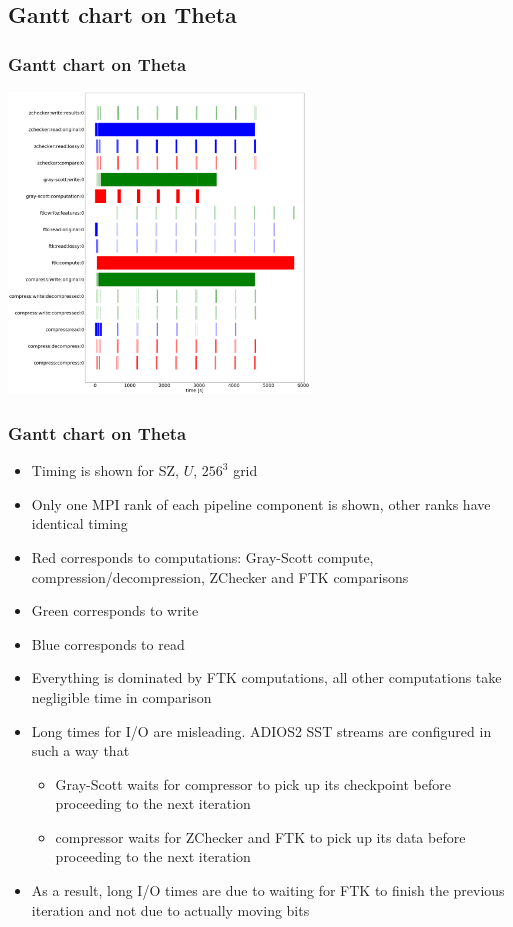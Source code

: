 \subsection{Gantt chart on Theta}

\begin{frame}[fragile]
  \frametitle{Gantt chart on Theta}

  \begin{center}
    \includegraphics[width=8cm]{graphs/gantt_theta.png}
  \end{center}
\end{frame}


\begin{frame}[fragile]
  \frametitle{Gantt chart on Theta}
  \begin{itemize}
  \item Timing is shown for SZ, $U$, $256^3$ grid
  \item Only one MPI rank of each pipeline component is shown, other ranks have identical timing
  \item Red corresponds to computations: Gray-Scott compute, compression/decompression, ZChecker and FTK comparisons
  \item Green corresponds to write
  \item Blue corresponds to read
  \item Everything is dominated by FTK computations, all other computations take negligible time in comparison
  \item Long times for I/O are misleading. ADIOS2 SST streams are configured in such a way that
    \begin{itemize}
    \item Gray-Scott waits for compressor to pick up its checkpoint before proceeding to the next iteration
    \item compressor waits for ZChecker and FTK to pick up its data before proceeding to the next iteration
    \end{itemize}
  \item As a result, long I/O times are due to waiting for FTK to finish the previous iteration and not due to actually moving bits
  \end{itemize}
\end{frame}


